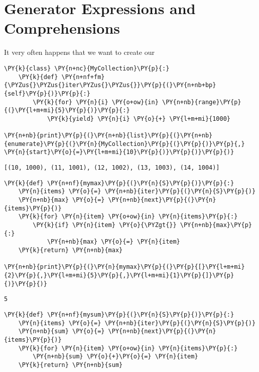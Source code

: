 \section{Generator Expressions and Comprehensions}


It very often happens that we want to create our


\begin{Verbatim}[commandchars=\\\{\}]
\PY{k}{class} \PY{n+nc}{MyCollection}\PY{p}{:}
    \PY{k}{def} \PY{n+nf+fm}{\PYZus{}\PYZus{}iter\PYZus{}\PYZus{}}\PY{p}{(}\PY{n+nb+bp}{self}\PY{p}{)}\PY{p}{:}
        \PY{k}{for} \PY{n}{i} \PY{o+ow}{in} \PY{n+nb}{range}\PY{p}{(}\PY{l+m+mi}{5}\PY{p}{)}\PY{p}{:}
            \PY{k}{yield} \PY{n}{i} \PY{o}{+} \PY{l+m+mi}{1000}

\PY{n+nb}{print}\PY{p}{(}\PY{n+nb}{list}\PY{p}{(}\PY{n+nb}{enumerate}\PY{p}{(}\PY{n}{MyCollection}\PY{p}{(}\PY{p}{)}\PY{p}{,} \PY{n}{start}\PY{o}{=}\PY{l+m+mi}{10}\PY{p}{)}\PY{p}{)}\PY{p}{)}
\end{Verbatim}

\begin{Verbatim}
[(10, 1000), (11, 1001), (12, 1002), (13, 1003), (14, 1004)]

\end{Verbatim}


\begin{Verbatim}[commandchars=\\\{\}]
\PY{k}{def} \PY{n+nf}{mymax}\PY{p}{(}\PY{n}{S}\PY{p}{)}\PY{p}{:}
    \PY{n}{items} \PY{o}{=} \PY{n+nb}{iter}\PY{p}{(}\PY{n}{S}\PY{p}{)}
    \PY{n+nb}{max} \PY{o}{=} \PY{n+nb}{next}\PY{p}{(}\PY{n}{items}\PY{p}{)}
    \PY{k}{for} \PY{n}{item} \PY{o+ow}{in} \PY{n}{items}\PY{p}{:}
        \PY{k}{if} \PY{n}{item} \PY{o}{\PYZgt{}} \PY{n+nb}{max}\PY{p}{:}
            \PY{n+nb}{max} \PY{o}{=} \PY{n}{item}
    \PY{k}{return} \PY{n+nb}{max}

\PY{n+nb}{print}\PY{p}{(}\PY{n}{mymax}\PY{p}{(}\PY{p}{[}\PY{l+m+mi}{2}\PY{p}{,}\PY{l+m+mi}{5}\PY{p}{,}\PY{l+m+mi}{1}\PY{p}{]}\PY{p}{)}\PY{p}{)}
\end{Verbatim}

\begin{Verbatim}
5

\end{Verbatim}

\begin{Verbatim}[commandchars=\\\{\}]
\PY{k}{def} \PY{n+nf}{mysum}\PY{p}{(}\PY{n}{S}\PY{p}{)}\PY{p}{:}
    \PY{n}{items} \PY{o}{=} \PY{n+nb}{iter}\PY{p}{(}\PY{n}{S}\PY{p}{)}
    \PY{n+nb}{sum} \PY{o}{=} \PY{n+nb}{next}\PY{p}{(}\PY{n}{items}\PY{p}{)}
    \PY{k}{for} \PY{n}{item} \PY{o+ow}{in} \PY{n}{items}\PY{p}{:}
        \PY{n+nb}{sum} \PY{o}{+}\PY{o}{=} \PY{n}{item}
    \PY{k}{return} \PY{n+nb}{sum}
\end{Verbatim}



